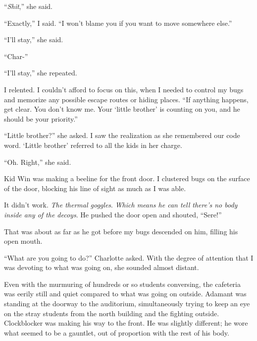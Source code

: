 ``\emph{Shit},'' she said.



``Exactly,'' I said.  ``I won't blame you if you want to move somewhere else.''



``I'll stay,'' she said.



``Char-''



``I'll stay,'' she repeated.



I relented.  I couldn't afford to focus on this, when I needed to control my bugs and memorize any possible escape routes or hiding places.  ``If anything happens, get clear.  You don't know me.  Your `little brother' is counting on you, and he should be your priority.''



``Little brother?'' she asked.  I saw the realization as she remembered our code word.  `Little brother' referred to all the kids in her charge.



``Oh.  Right,'' she said.



Kid Win was making a beeline for the front door.  I clustered bugs on the surface of the door, blocking his line of sight as much as I was able.



It didn't work.  \emph{The thermal goggles}.  \emph{Which means he can tell there's no body inside any of the decoys}.  He pushed the door open and shouted, ``Sere!''



That was about as far as he got before my bugs descended on him, filling his open mouth.



``What are you going to do?'' Charlotte asked.  With the degree of attention that I was devoting to what was going on, she sounded almost distant.



Even with the murmuring of hundreds or so students conversing, the cafeteria was eerily still and quiet compared to what was going on outside.  Adamant was standing at the doorway to the auditorium, simultaneously trying to keep an eye on the stray students from the north building and the fighting outside.  Clockblocker was making his way to the front.  He was slightly different; he wore what seemed to be a gauntlet, out of proportion with the rest of his body.



